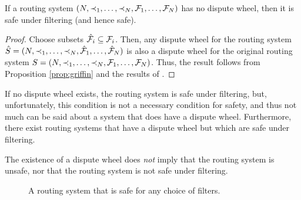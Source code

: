 


\begin{corollary}
\label{cor:dwfilter}
If a routing system $(N, \prec_1,\ldots,\prec_N, \mathcal{F}_1, \ldots,
\mathcal{F}_N)$ has no dispute wheel, then it is safe under filtering (and
hence safe).
\end{corollary}

\begin{proof}
Choose subsets $\hat{\mathcal{F}}_i \subseteq \mathcal{F}_i$.  Then, any dispute wheel for
the routing system $\hat{S} = (N, \prec_1,\lb
\ldots, \prec_N, \hat{\F}_1, \ldots, \hat{\F}_N)$ is also a
dispute wheel for the original routing system $S = (N, \prec_1, \ldots,\lb
\prec_N, \F_1, \ldots, \F_N)$.  Thus, the result follows from
Proposition \ref{prop:griffin} and the results of \cite{Griffin2002c}.
\end{proof}

If no dispute wheel exists, the routing system is safe under filtering,
but, unfortunately, this condition is not a 
necessary condition for safety, and thus not much can be said about a
system that does have a dispute wheel.  
Furthermore, there exist routing systems that have a dispute wheel but
which are safe under filtering.

\begin{observation}
The existence of a dispute wheel does {\em not} imply that the routing
system is unsafe, nor that the routing system is not safe under
filtering.
\end{observation}


\begin{figure}
\centerline{}
\caption{A routing system that is safe
  for any choice of filters.} 
\label{fig:dw_no_osc}
\end{figure}


